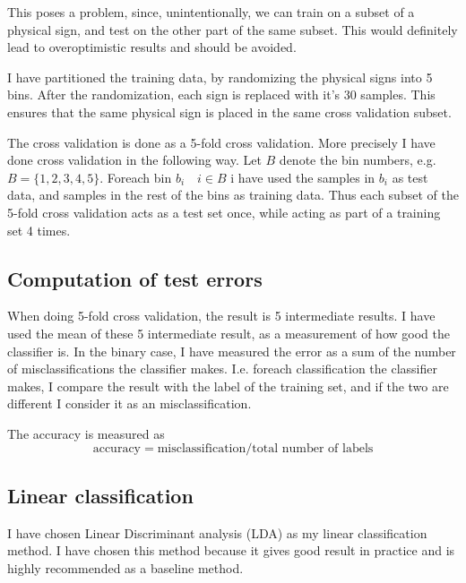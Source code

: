 \documentclass[10pt]{article}
\begin{document}
This poses a problem, since, unintentionally, we can train on a subset of a physical sign, and test on the other part of the same subset. This would definitely lead to overoptimistic results and should be avoided.

I have partitioned the training data, by randomizing the physical signs into 5 bins. After the randomization, each sign is replaced with it's 30 samples. This ensures that the same physical sign is placed in the same cross validation subset.

The cross validation is done as a 5-fold cross validation. More precisely I have done cross validation in the following way. Let $B$ denote the bin numbers, e.g. $B = \{1,2,3,4,5\}$. Foreach bin $b_i \quad i \in B$ i have used the samples in $b_i$ as test data, and samples in the rest of the bins as training data. Thus each subset of the 5-fold cross validation acts as a test set once, while acting as part of a training set 4 times.

\subsection*{Computation of test errors} %
\label{sub:computation_of_test_errors}
When doing 5-fold cross validation, the result is 5 intermediate results. I have used the mean of these 5 intermediate result, as a measurement of how good the classifier is. In the binary case, I have measured the error as a sum of the number of misclassifications the classifier makes. I.e. foreach classification the classifier makes, I compare the result with the label of the training set, and if the two are different I consider it as an misclassification.

The accuracy is measured as 
\begin{equation}
  \text{accuracy} = \text{misclassification}/\text{total number of labels}
\end{equation}


\subsection*{Linear classification} %
\label{sub:linear_classification}
I have chosen Linear Discriminant analysis (LDA) as my linear classification method. I have chosen this method because it gives good result in practice and is highly recommended as a baseline method\cite{LDAslides}. 
\end{document}
